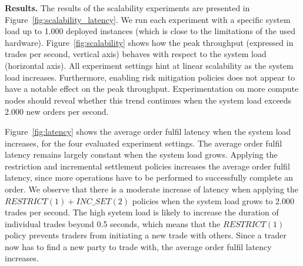 
\textbf{Results.}
The results of the scalability experiments are presented in Figure~\ref{fig:scalability_latency}.
We run each experiment with a specific system load up to 1.000 deployed instances (which is close to the limitations of the used hardware).
Figure~\ref{fig:scalability} shows how the peak throughput (expressed in trades per second, vertical axis) behaves with respect to the system load (horizontal axis).
All experiment settings hint at linear scalability as the system load increases.
Furthermore, enabling risk mitigation policies does not appear to have a notable effect on the peak throughput.
Experimentation on more compute nodes should reveal whether this trend continues when the system load exceeds 2.000 new orders per second.

Figure~\ref{fig:latency} shows the average order fulfil latency when the system load increases, for the four evaluated experiment settings.
The average order fulfil latency remains largely constant when the system load grows.
Applying the restriction and incremental settlement policies increases the average order fulfil latency, since more operations have to be performed to successfully complete an order.
We observe that there is a moderate increase of latency when applying the $ RESTRICT(1) + INC\_SET(2) $ policies when the system load grows to 2.000 trades per second.
The high system load is likely to increase the duration of individual trades beyond 0.5 seconds, which means that the $ RESTRICT(1) $ policy prevents traders from initiating a new trade with others.
Since a trader now has to find a new party to trade with, the average order fulfil latency increases.

